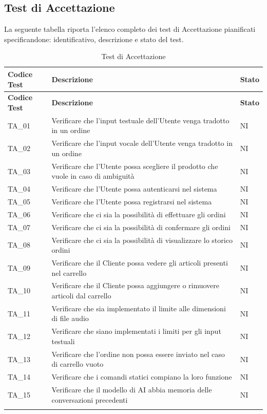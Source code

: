 \subsection{Test di Accettazione}
La seguente tabella riporta l’elenco completo dei test di Accettazione pianificati specificandone: identificativo, descrizione e stato del test.
\begin{longtable}{|
    >{\raggedright\arraybackslash}p{} |
    >{\centering\arraybackslash}p{} |
    >{\centering\arraybackslash}p{} |
    }
    \hline
    \rowcolor[gray]{0.9}
    \textbf{Codice Test} & \textbf{Descrizione} & \textbf{Stato}\\
    \hline
    \endfirsthead

    \hline
    \rowcolor[gray]{0.9}
    \textbf{Codice Test} & \textbf{Descrizione} & \textbf{Stato}\\
    \hline
    \endhead

    \hline
    TA\_01 & Verificare che l'input testuale dell'Utente venga tradotto in un ordine & NI \\ \hline
    TA\_02 & Verificare che l'input vocale dell'Utente venga tradotto in un ordine & NI \\ \hline
    TA\_03 & Verificare che l'Utente possa scegliere il prodotto che vuole in caso di ambiguità & NI \\ \hline
    TA\_04 & Verificare che l'Utente possa autenticarsi nel sistema & NI \\ \hline
    TA\_05 & Verificare che l'Utente possa registrarsi nel sistema & NI \\ \hline
    TA\_06 & Verificare che ci sia la possibilità di effettuare gli ordini & NI \\ \hline
    TA\_07 & Verificare che ci sia la possibilità di confermare gli ordini & NI \\ \hline
    TA\_08 & Verificare che ci sia la possibilità di visualizzare lo storico ordini & NI \\ \hline
    TA\_09 & Verificare che il Cliente possa vedere gli articoli presenti nel carrello & NI \\ \hline
    TA\_10 & Verificare che il Cliente possa aggiungere o rimuovere articoli dal carrello & NI \\ \hline
    TA\_11 & Verificare che sia implementato il limite alle dimensioni di file audio & NI \\ \hline
    TA\_12 & Verificare che siano implementati i limiti per gli input testuali & NI \\ \hline
    TA\_13 & Verificare che l'ordine non possa essere inviato nel caso di carrello vuoto & NI \\ \hline
    TA\_14 & Verificare che i comandi statici compiano la loro funzione & NI \\ \hline
    TA\_15 & Verificare che il modello di AI abbia memoria delle conversazioni precedenti & NI \\ \hline

    \caption{Test di Accettazione}
\end{longtable}


